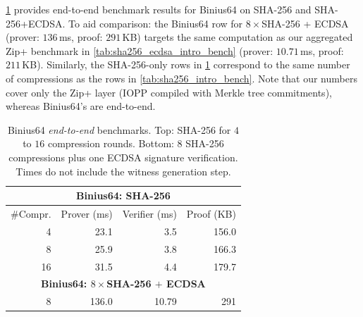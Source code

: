 \cref{tab:sha256-benchmark} provides end-to-end benchmark results for Binius64 on SHA-256 and SHA-256+ECDSA. To aid comparison: the Binius64 row for $8\times$SHA-256 + ECDSA (prover: $136$\,ms, proof: $291$\,KB) targets the same computation as our aggregated Zip+ benchmark in \cref{tab:sha256_ecdsa_intro_bench} (prover: $10.71$\,ms, proof: $211$\,KB). Similarly, the SHA-256-only rows in \cref{tab:sha256-benchmark} correspond to the same number of compressions as the rows in \cref{tab:sha256_intro_bench}. Note that our numbers cover only the Zip+ layer (IOPP compiled with Merkle tree commitments), whereas Binius64's are end-to-end.
\begin{table}[H]
\centering
\begin{tabular}{rrrr}
\toprule
\multicolumn{4}{c}{\textbf{Binius64: SHA-256}} \\
\midrule
\#Compr. & Prover (ms) & Verifier (ms) & Proof (KB) \\
\midrule
4 & 23.1 & 3.5 & 156.0 \\
8 & 25.9 & 3.8 & 166.3 \\
16 & 31.5 & 4.4 & 179.7 \\
\midrule
\multicolumn{4}{c}{\textbf{Binius64: $8\times$SHA-256 $+$ ECDSA}} \\
\midrule
8 & 136.0
 & 10.79 & 291 \\
\bottomrule
\end{tabular}
\caption{Binius64 \emph{end-to-end} benchmarks. Top: SHA-256 for $4$ to $16$ compression rounds. Bottom: $8$ SHA-256 compressions plus one ECDSA signature verification. Times do not include the witness generation step.}
\label{tab:sha256-benchmark}
\end{table}

